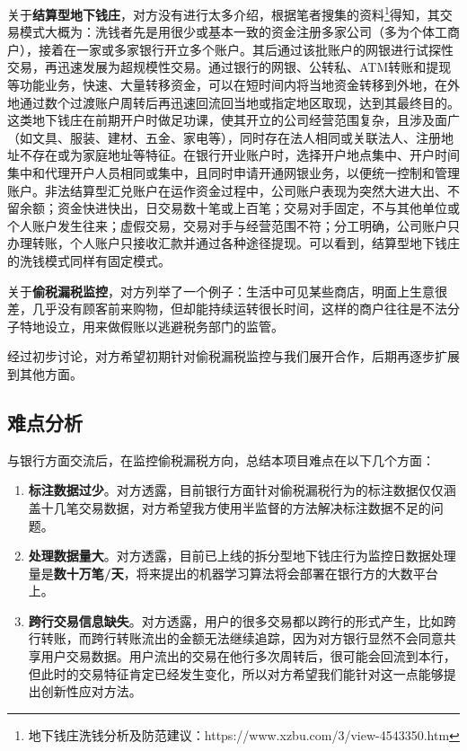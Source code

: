 \documentclass{article}
\begin{document}
关于\textbf{结算型地下钱庄}，对方没有进行太多介绍，根据笔者搜集的资料\footnote{地下钱庄洗钱分析及防范建议：https://www.xzbu.com/3/view-4543350.htm}得知，其交易模式大概为：洗钱者先是用很少或基本一致的资金注册多家公司（多为个体工商户），接着在一家或多家银行开立多个账户。其后通过该批账户的网银进行试探性交易，再迅速发展为超规模性交易。通过银行的网银、公转私、ATM转账和提现等功能业务，快速、大量转移资金，可以在短时间内将当地资金转移到外地，在外地通过数个过渡账户周转后再迅速回流回当地或指定地区取现，达到其最终目的。这类地下钱庄在前期开户时做足功课，使其开立的公司经营范围复杂，且涉及面广（如文具、服装、建材、五金、家电等），同时存在法人相同或关联法人、注册地址不存在或为家庭地址等特征。在银行开业账户时，选择开户地点集中、开户时间集中和代理开户人员相同或集中，且同时申请开通网银业务，以便统一控制和管理账户。非法结算型汇兑账户在运作资金过程中，公司账户表现为突然大进大出、不留余额；资金快进快出，日交易数十笔或上百笔；交易对手固定，不与其他单位或个人账户发生往来；虚假交易，交易对手与经营范围不符；分工明确，公司账户只办理转账，个人账户只接收汇款并通过各种途径提现。可以看到，结算型地下钱庄的洗钱模式同样有固定模式。

关于\textbf{偷税漏税监控}，对方列举了一个例子：生活中可见某些商店，明面上生意很差，几乎没有顾客前来购物，但却能持续运转很长时间，这样的商户往往是不法分子特地设立，用来做假账以逃避税务部门的监管。

经过初步讨论，对方希望初期针对偷税漏税监控与我们展开合作，后期再逐步扩展到其他方面。

\subsection{难点分析}
与银行方面交流后，在监控偷税漏税方向，总结本项目难点在以下几个方面：
\begin{enumerate}
    \item \textbf{标注数据过少}。对方透露，目前银行方面针对偷税漏税行为的标注数据仅仅涵盖十几笔交易数据，对方希望我方使用半监督的方法解决标注数据不足的问题。
    \item \textbf{处理数据量大}。对方透露，目前已上线的拆分型地下钱庄行为监控日数据处理量是\textbf{数十万笔/天}，将来提出的机器学习算法将会部署在银行方的大数平台上。
    \item \textbf{跨行交易信息缺失}。对方透露，用户的很多交易都以跨行的形式产生，比如跨行转账，而跨行转账流出的金额无法继续追踪，因为对方银行显然不会同意共享用户交易数据。用户流出的交易在他行多次周转后，很可能会回流到本行，但此时的交易特征肯定已经发生变化，所以对方希望我们能针对这一点能够提出创新性应对方法。
\end{enumerate}
\end{document}
